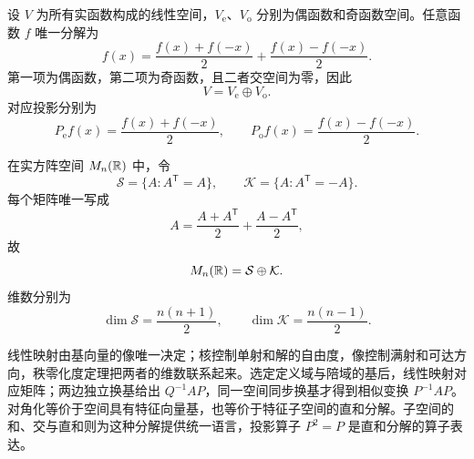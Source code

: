 \begin{example}[title={奇偶函数分解}]
设 $V$ 为所有实函数构成的线性空间，$V_{\mathrm e}$、$V_{\mathrm o}$ 分别为偶函数和奇函数空间。任意函数 $f$ 唯一分解为
\[
f(x)=\frac{f(x)+f(-x)}2+\frac{f(x)-f(-x)}2.
\]
第一项为偶函数，第二项为奇函数，且二者交空间为零，因此
\[
V=V_{\mathrm e}\oplus V_{\mathrm o}.
\]
对应投影分别为
\[
P_{\mathrm e}f(x)=\frac{f(x)+f(-x)}2,\qquad
P_{\mathrm o}f(x)=\frac{f(x)-f(-x)}2.
\]
\end{example}

\begin{example}[title={方阵的对称与反对称分解}]
在实方阵空间 $M_n(\mathbb{R})$ 中，令
\[
\mathcal S=\{A:A^{\mathsf T}=A\},\qquad
\mathcal K=\{A:A^{\mathsf T}=-A\}.
\]
每个矩阵唯一写成
\[
A=\frac{A+A^{\mathsf T}}2+\frac{A-A^{\mathsf T}}2,
\]
故
\[
M_n(\mathbb{R})=\mathcal S\oplus\mathcal K.
\]
维数分别为
\[
\dim\mathcal S=\frac{n(n+1)}2,\qquad
\dim\mathcal K=\frac{n(n-1)}2.
\]
\end{example}

\begin{summary}[本章知识链]
线性映射由基向量的像唯一决定；核控制单射和解的自由度，像控制满射和可达方向，秩零化度定理把两者的维数联系起来。选定定义域与陪域的基后，线性映射对应矩阵；两边独立换基给出 $Q^{-1}AP$，同一空间同步换基才得到相似变换 $P^{-1}AP$。对角化等价于空间具有特征向量基，也等价于特征子空间的直和分解。子空间的和、交与直和则为这种分解提供统一语言，投影算子 $P^2=P$ 是直和分解的算子表达。
\end{summary}
